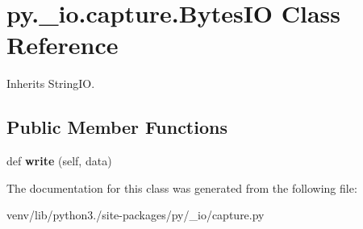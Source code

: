 \hypertarget{classpy_1_1__io_1_1capture_1_1_bytes_i_o}{}\section{py.\+\_\+io.\+capture.\+Bytes\+IO Class Reference}
\label{classpy_1_1__io_1_1capture_1_1_bytes_i_o}


Inherits String\+IO.

\subsection*{Public Member Functions}
\begin{DoxyCompactItemize}
\item 
\mbox{\label{classpy_1_1__io_1_1capture_1_1_bytes_i_o_aea9655dac849ea19823fcdedb52501af}} 
def {\bfseries write} (self, data)
\end{DoxyCompactItemize}


The documentation for this class was generated from the following file\+:\begin{DoxyCompactItemize}
\item 
venv/lib/python3./site-\/packages/py/\+\_\+io/capture.\+py\end{DoxyCompactItemize}
